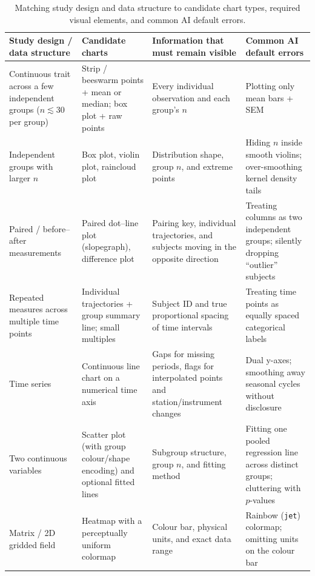 \begin{table}[htbp]\centering\footnotesize
\setlength{\tabcolsep}{3pt}
\renewcommand{\arraystretch}{1.15}
\caption{Matching study design and data structure to candidate chart types, required visual elements, and common AI default errors.}\label{tab:ch05-01}
\begin{tabularx}{\linewidth}{@{}>{\raggedright\arraybackslash}p{28mm}>{\raggedright\arraybackslash}p{25mm}YY@{}}
\toprule
\textbf{Study design / data structure} & \textbf{Candidate charts} & \textbf{Information that must remain visible} & \textbf{Common AI default errors} \\
\midrule
Continuous trait across a few independent groups ($n \lesssim 30$ per group) & Strip / beeswarm points + mean or median; box plot + raw points & Every individual observation and each group's $n$ & Plotting only mean bars + SEM \\
Independent groups with larger $n$ & Box plot, violin plot, raincloud plot & Distribution shape, group $n$, and extreme points & Hiding $n$ inside smooth violins; over-smoothing kernel density tails \\
Paired / before--after measurements & Paired dot--line plot (slopegraph), difference plot & Pairing key, individual trajectories, and subjects moving in the opposite direction & Treating columns as two independent groups; silently dropping ``outlier'' subjects \\
Repeated measures across multiple time points & Individual trajectories + group summary line; small multiples & Subject ID and true proportional spacing of time intervals & Treating time points as equally spaced categorical labels \\
Time series & Continuous line chart on a numerical time axis & Gaps for missing periods, flags for interpolated points and station/instrument changes & Dual y-axes; smoothing away seasonal cycles without disclosure \\
Two continuous variables & Scatter plot (with group colour/shape encoding) and optional fitted lines & Subgroup structure, group $n$, and fitting method & Fitting one pooled regression line across distinct groups; cluttering with $p$-values \\
Matrix / 2D gridded field & Heatmap with a perceptually uniform colormap & Colour bar, physical units, and exact data range & Rainbow (\texttt{jet}) colormap; omitting units on the colour bar \\
\bottomrule
\end{tabularx}
\end{table}

